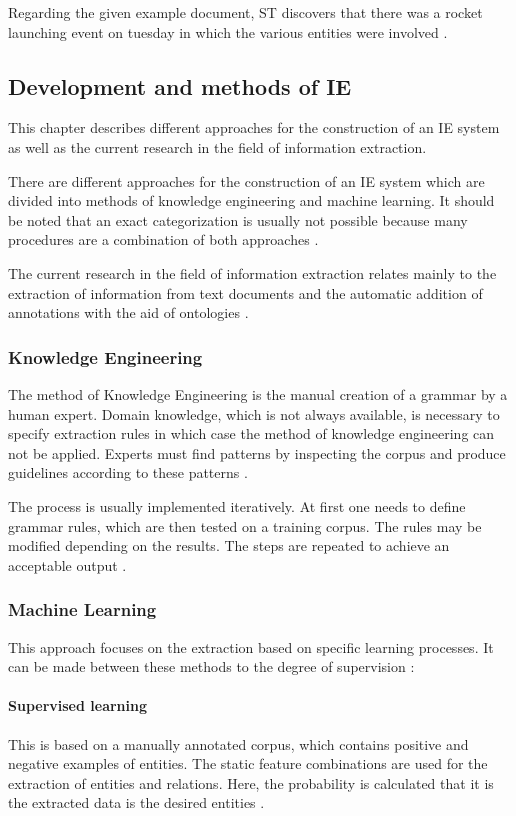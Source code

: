 Regarding the given example document, \gls{ST} discovers that there was a rocket launching event on tuesday in which the various entities were involved \cite{Cunningham:2005}.

\subsection{Development and methods of \gls{IE}}
This chapter describes different approaches for the construction of an IE system as well as the current research in the field of information extraction.

There are different approaches for the construction of an IE system which are divided into methods of knowledge engineering and machine learning. It should be noted that an exact categorization is usually not possible because many procedures are a combination of both approaches \cite{Schramm:2008}.

The current research in the field of information extraction relates mainly to the extraction of information from text documents and the automatic addition of annotations with the aid of ontologies \cite{Linsmayr:2010}.

\subsubsection{Knowledge Engineering}
The method of Knowledge Engineering is the manual creation of a grammar by a human expert. Domain knowledge, which is not always available, is necessary to specify extraction rules in which case the method of knowledge engineering can not be applied. Experts must find patterns by inspecting the corpus and produce guidelines according to these patterns \cite{Schramm:2008}\cite{Turmo:2006}.

The process is usually implemented iteratively. At first one needs to define grammar rules, which are then tested on a training corpus. The rules may be modified depending on the results. The steps are repeated to achieve an acceptable output \cite{Appelt:1999}.

\subsubsection{Machine Learning}
This approach focuses on the extraction based on specific learning processes. It can be made between these methods to the degree of supervision \cite{Carstensen:2010}\cite{Schramm:2008}:

\paragraph{Supervised learning}
This is based on a manually annotated corpus, which contains positive and negative examples of entities. The static feature combinations are used for the extraction of entities and relations. Here, the probability is calculated that it is the extracted data is the desired entities \cite{Schramm:2008}\cite{Siefkes:2005}\cite{Carstensen:2010}.

